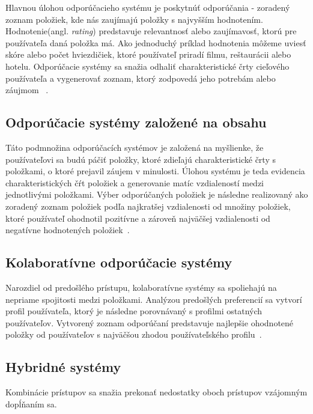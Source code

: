 Hlavnou úlohou odporúčacieho systému je poskytnúť odporúčania - zoradený zoznam položiek, kde nás zaujímajú položky s najvyšším hodnotením. Hodnotenie(angl. \textit{rating}) predstavuje relevantnosť alebo zaujímavosť, ktorú pre používateľa daná položka má. Ako jednoduchý príklad hodnotenia môžeme uviesť skóre alebo počet hviezdičiek, ktoré používateľ priradí filmu, reštaurácii alebo hotelu. Odporúčacie systémy sa snažia odhaliť charakteristické črty cieľového používateľa a vygenerovať zoznam, ktorý zodpovedá jeho potrebám alebo záujmom ~\cite{adomavicius2005toward}.

\subsection{Odporúčacie systémy založené na obsahu}
\label{content_based_recommenders}

Táto podmnožina odporúčacích systémov je založená na myšlienke, že používateľovi sa budú páčiť položky, ktoré zdieľajú charakteristické črty s položkami, o ktoré prejavil záujem v minulosti. Úlohou systému je teda evidencia charakteristických čŕt položiek a generovanie matíc vzdialeností medzi jednotlivými položkami. Výber odporúčaných položiek je následne realizovaný ako zoradený zoznam položiek podľa najkratšej vzdialenosti od množiny položiek, ktoré používateľ ohodnotil pozitívne a zároveň najväčšej vzdialenosti od negatívne hodnotených položiek~\cite{adomavicius2005toward}.


\subsection{Kolaboratívne odporúčacie systémy}
\label{collaboration_based_recommenders}

Narozdiel od predošlého prístupu, kolaboratívne systémy sa spoliehajú na nepriame spojitosti medzi položkami. Analýzou predošlých preferencií sa vytvorí profil používateľa, ktorý je následne porovnávaný s profilmi ostatných používateľov. Vytvorený zoznam odporúčaní predstavuje najlepšie ohodnotené položky od používateľov s najväčšou zhodou používateľského profilu~\cite{adomavicius2005toward}.

\subsection{Hybridné systémy}
\label{hybrid_recommenders}

Kombinácie prístupov sa snažia prekonať nedostatky oboch prístupov vzájomným dopĺňaním sa. 

